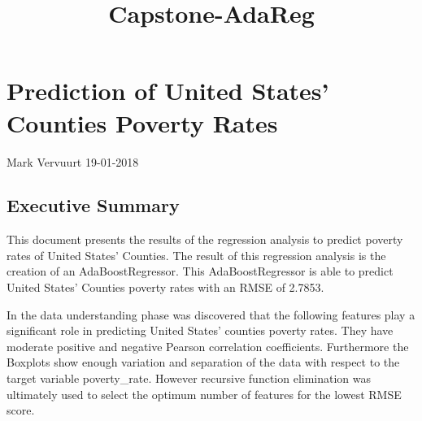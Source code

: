\documentclass[11pt]{article}
\title{Capstone-AdaReg}
\begin{document}
    
    
    \maketitle
    
    

    
    \section{Prediction of United States' Counties Poverty
Rates}\label{prediction-of-united-states-counties-poverty-rates}

Mark Vervuurt 19-01-2018

\subsection{Executive Summary}\label{executive-summary}

This document presents the results of the regression analysis to predict
poverty rates of United States' Counties. The result of this regression
analysis is the creation of an AdaBoostRegressor. This AdaBoostRegressor
is able to predict United States' Counties poverty rates with an RMSE of
2.7853.

In the data understanding phase was discovered that the following
features play a significant role in predicting United States' counties
poverty rates. They have moderate positive and negative Pearson
correlation coefficients. Furthermore the Boxplots show enough variation
and separation of the data with respect to the target variable
poverty\_rate. However recursive function elimination was ultimately
used to select the optimum number of features for the lowest RMSE score.
\end{document}
